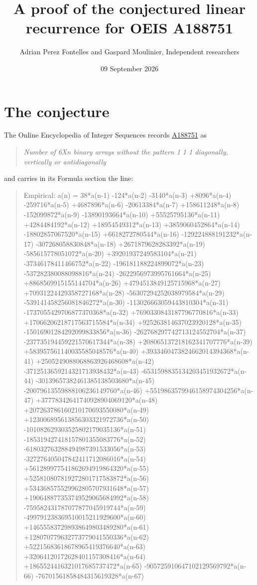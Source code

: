 \documentclass[11pt]{article}
\title{A proof of the conjectured linear recurrence for OEIS A188751}
\author{Adrian Perez Fontelles and Gaspard Moulinier, Independent researchers}
\date{09 September 2026}
\theoremstyle{definition}
\begin{document}
\maketitle
\section{The conjecture}

The Online Encyclopedia of Integer Sequences records \href{https://oeis.org/A188751}{A188751} as

\begin{quote}\itshape Number of 6Xn binary arrays without the pattern 1 1 1 diagonally, vertically or antidiagonally\end{quote}

and carries in its Formula section the line:

\begin{quote}\ttfamily Empirical: a(n) = 38*a(n-1) -124*a(n-2) -3140*a(n-3) +8096*a(n-4) -259716*a(n-5) +4687896*a(n-6) -20613384*a(n-7) +158611248*a(n-8) -152099872*a(n-9) -13890193664*a(n-10) +55525795136*a(n-11) +4284484192*a(n-12) +18954549312*a(n-13) +3859060452864*a(n-14) -18802857067520*a(n-15) +6618272780544*a(n-16) -129224888191232*a(n-17) -307268058830848*a(n-18) +2671879628283392*a(n-19) -585615778051072*a(n-20) +39201937249583104*a(n-21) -37346178411466752*a(n-22) -196181188224899072*a(n-23) -537282380088098816*a(n-24) -2622956973995761664*a(n-25) +8868569915155144704*a(n-26) +4794513849125715968*a(n-27) +70931224429358727168*a(n-28) -56307294252038979584*a(n-29) -539141458256081846272*a(n-30) -113026663059443810304*a(n-31) -1737055429706877370368*a(n-32) +7690330843187796770816*a(n-33) +17066206218717563715584*a(n-34) +925263814637023920128*a(n-35) -15016901284292099833856*a(n-36) -262768297742713124552704*a(n-37) -237735194459221570617344*a(n-38) +208065137218162341707776*a(n-39) +583957561140035585048576*a(n-40) +3933460473824662014394368*a(n-41) +2505249088068863926468608*a(n-42) -3712513659214321713938432*a(n-43) -6531598835134203451932672*a(n-44) -30139657382461385138503680*a(n-45) -20079613559888106236149760*a(n-46) +5519863579946158974304256*a(n-47) +37778342641740928904069120*a(n-48) +207263786160210170693550080*a(n-49) +123006895613856303321972736*a(n-50) -101082629303525802179035136*a(n-51) -185319427418157801355083776*a(n-52) -618032763288494987391533056*a(n-53) -327276405047842411712086016*a(n-54) +561289977541862694919864320*a(n-55) +525810807819272801717583872*a(n-56) +534368575529962805707931648*a(n-57) +190648877353749529065684992*a(n-58) -759582431787077877045919744*a(n-59) -499791238369510015211929600*a(n-60) +146555837298938649803489280*a(n-61) +128070779632773779041550336*a(n-62) +52215683618678965419376640*a(n-63) +32064120172628401157308416*a(n-64) +1865524416321017685737472*a(n-65) -905725910647102129569792*a(n-66) -76701561858484315619328*a(n-67)\end{quote}
\end{document}
